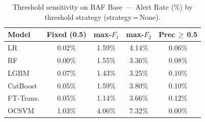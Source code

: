 \begin{table}[H]
\centering
\caption{Threshold sensitivity on BAF Base~--- Alert Rate (\%) by threshold strategy (strategy\,=\,None).}
\label{tab:threshold_baf_alert}
\begin{tabular}{l c c c c}
\toprule
Model & Fixed (0.5) & max-$F_1$ & max-$F_2$ & Prec\,$\geq$\,0.5 \\
\midrule
LR         & 0.02\% & 1.59\% & 4.14\% & 0.06\% \\
RF         & 0.00\% & 1.55\% & 3.36\% & 0.08\% \\
LGBM       & 0.07\% & 1.43\% & 3.25\% & 0.10\% \\
CatBoost   & 0.05\% & 1.59\% & 3.80\% & 0.10\% \\
FT-Trans.  & 0.05\% & 1.14\% & 3.66\% & 0.12\% \\
OCSVM      & 1.03\% & 4.06\% & 7.32\% & 0.00\% \\
\bottomrule
\end{tabular}
\end{table}